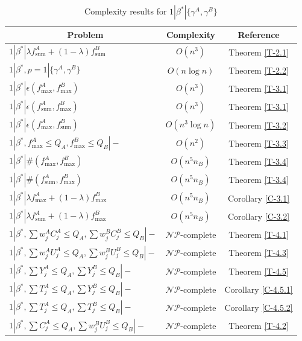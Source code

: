 \documentclass[12pt]{article}
\begin{document}
\begin{sloppypar}
\begin{table}[H] 
\footnotesize
\caption{Complexity results for $1 | \beta^{*}|\{\gamma^A, \gamma^B\}$} \label{TA-9.1}
\vspace{-10pt}
\begin{center}
\begin{tabular}{|l|c|c|} \hline
~~~~~~~~~~~~Problem  & Complexity & Reference  \\ \hline
$1|\beta^{*}|\lambda f_{\mathrm{sum}}^{A}+(1-\lambda) f_{\mathrm{sum}}^{B}$ & $O(n^3)$ &Theorem \ref{T-2.1}\\
$1 | \beta^{*},p=1|\{\gamma^A, \gamma^B\}$ & $O(n \log n)$ &Theorem \ref{T-2.2}\\
$1|\beta^{*}|\epsilon(f_{\max}^A, f_{\max}^B)$ & $O(n^3)$ &Theorem \ref{T-3.1}\\
$1 | \beta^{*} |\epsilon(f_{\mathrm{sum}}^{A}, f_{\max}^B)$ & $O(n^3)$ &Theorem \ref{T-3.1}\\
$1 | \beta^{*} |\epsilon(f_{\max}^A, f_{\mathrm{sum}}^B)$ & $O(n^3 \log n)$ &Theorem \ref{T-3.2}\\
$1 | \beta^{*}, f_{\max}^A \leq Q_A, f_{\max}^B \leq Q_B |-$ & $O(n^2)$ &Theorem \ref{T-3.3}\\
$1 | \beta^{*} |\#(f_{\max}^A, f_{\max}^B)$ & $O(n^5 n_B)$ &Theorem \ref{T-3.4}\\
$1 | \beta^{*} |\#(f_{\mathrm{sum}}^A, f_{\max}^B)$ & $O(n^5 n_B)$ &Theorem \ref{T-3.4}\\
$1 | \beta^{*} |\lambda f_{\max}^A +(1-\lambda) f_{\max}^B$ & $O(n^5 n_B)$ &Corollary \ref{C-3.1}\\
$1 | \beta^{*} |\lambda f_{\mathrm{sum}}^A +(1-\lambda) f_{\max}^B$ & $O(n^5 n_B)$ &Corollary \ref{C-3.2}\\
$1 | \beta^{*}, \sum w_j^A C_j^A \leq Q_A, \sum w_j^B C_j^B \leq Q_B|-$ & $\mathcal{NP}$-complete &Theorem \ref{T-4.1}\\
$1 | \beta^{*}, \sum w_j^A U_j^A \leq Q_A, \sum w_j^B U_j^B \leq Q_B|-$ & $\mathcal{NP}$-complete &Theorem \ref{T-4.3}\\
$1 | \beta^{*}, \sum Y_j^A \leq Q_A, \sum Y_j^B \leq Q_B|-$ & $\mathcal{NP}$-complete &Theorem \ref{T-4.5}\\
$1 | \beta^{*}, \sum T_j^A \leq Q_A, \sum Y_j^B \leq Q_B|-$ & $\mathcal{NP}$-complete &Corollary \ref{C-4.5.1} \\
$1 | \beta^{*}, \sum T_j^A \leq Q_A, \sum T_j^B \leq Q_B|-$ & $\mathcal{NP}$-complete &Corollary \ref{C-4.5.2} \\
$1 | \beta^{*}, \sum C_j^A \leq Q_A, \sum w_j^B U_j^B \leq Q_B|-$ & $\mathcal{NP}$-complete &Theorem \ref{T-4.2}\\

\end{tabular}
\end{center}
\end{table}
\end{sloppypar}
\end{document}

